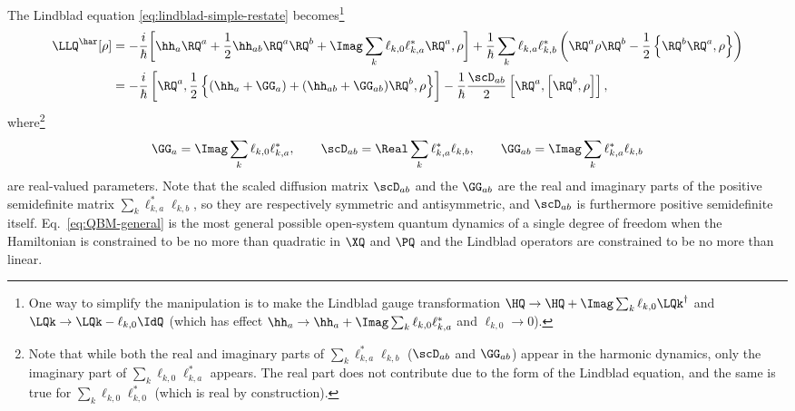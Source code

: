 \documentclass{article}
\numberwithin{equation}{section}
\begin{document}
The Lindblad equation \eqref{eq:lindblad-simple-restate} becomes\footnote{One way to simplify the manipulation is to make the Lindblad gauge transformation $\HQ \to \HQ + \Imag \sum_k \ell_{k,0} \LQk^\dagger$ and $\LQk \to \LQk - \ell_{k,0} \IdQ$ (which has effect $\hh_a \to \hh_a + \Imag \sum_k \ell_{k,0}  \ell_{k,a}^*$ and $\ell_{k,0} \to 0$).} \cite{dekker1981classical,isar1994open}
\begin{align}
    \LLQ^{\har} [\rho]
    & = -\frac{i}{\hbar}\bigg[\hh_a\RQ^a+ \frac{1}{2}\hh_{ab}\RQ^a\RQ^b+\Imag \sum_k \ell_{k,0} \ell_{k,a}^*\RQ^a,\rho \bigg] + \frac{1}{\hbar} \sum_k \ell_{k,a} \ell_{k,b}^*\left( \RQ^a \rho \RQ^b - \frac{1}{2} \left\{  \RQ^b \RQ^a,\rho\right\} \right) \\
    \label{eq:QBM-general}
    &= - \frac{i}{\hbar}\left[\RQ^a,\frac{1}{2}\left\{(\hh_a + \GG_a) + (\hh_{ab} +\GG_{ab})\RQ^b, \rho \right\} \right] - \frac{1}{\hbar}\frac{\scD_{ab}}{2} \left[ \RQ^a,\left[\RQ^b, \rho \right] \right],
\end{align}
where\footnote{Note that while both the real and imaginary parts of $\sum_k \ell_{k,a}^* \ell_{k,b}$ ($\scD_{ab}$ and $\GG_{ab}$) appear in the harmonic dynamics, only the imaginary part of $\sum_k \ell_{k,0} \ell_{k,a}^*$ appears. The real part does not contribute due to the form of the Lindblad equation, and the same is true for $\sum_k \ell_{k,0} \ell_{k,0}^*$ (which is real by construction).} 
\begin{align}\label{eq:harmonic-parameters}
	\GG_a = \Imag \sum_k \ell_{k,0} \ell_{k,a}^*, \qquad
        \scD_{ab} =  \Real \sum_k \ell_{k,a}^* \ell_{k,b} , \qquad 
	\GG_{ab} = \Imag \sum_k  \ell_{k,a}^* \ell_{k,b} 
\end{align}
are real-valued parameters.  Note that the scaled diffusion matrix $\scD_{ab}$ and the  $\GG_{ab}$ are the real and imaginary parts of the positive semidefinite matrix $\sum_k \ell_{k,a}^* \ell_{k,b}$, so they are respectively symmetric and antisymmetric, and $\scD_{ab}$ is furthermore positive semidefinite itself.
Eq.~\eqref{eq:QBM-general} is the most general possible open-system quantum dynamics of a single degree of freedom when the Hamiltonian is constrained to be no more than quadratic in $\XQ$ and $\PQ$ and the Lindblad operators are constrained to be no more than linear.
\end{document}
